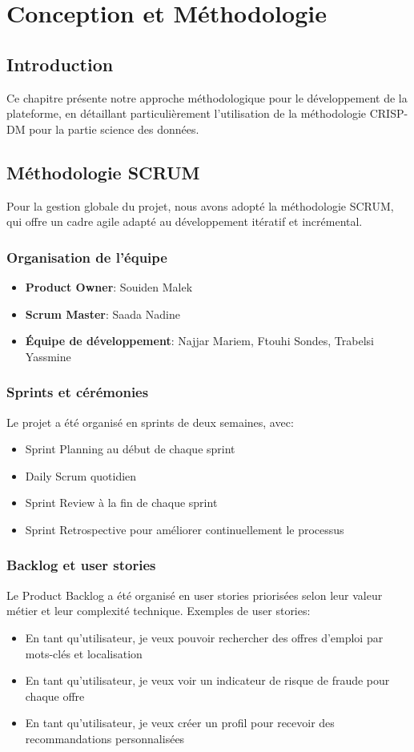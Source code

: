 \documentclass[10pt,a4paper,twocolumn]{article}
\begin{document}
\section{Conception et Méthodologie}
\subsection{Introduction}
Ce chapitre présente notre approche méthodologique pour le développement de la plateforme, en détaillant particulièrement l'utilisation de la méthodologie CRISP-DM pour la partie science des données.

\subsection{Méthodologie SCRUM}
Pour la gestion globale du projet, nous avons adopté la méthodologie SCRUM, qui offre un cadre agile adapté au développement itératif et incrémental.

\subsubsection{Organisation de l'équipe}
\begin{itemize}
    \item \textbf{Product Owner}: Souiden Malek
    \item \textbf{Scrum Master}: Saada Nadine
    \item \textbf{Équipe de développement}: Najjar Mariem, Ftouhi Sondes, Trabelsi Yassmine
\end{itemize}

\subsubsection{Sprints et cérémonies}
Le projet a été organisé en sprints de deux semaines, avec:
\begin{itemize}
    \item Sprint Planning au début de chaque sprint
    \item Daily Scrum quotidien
    \item Sprint Review à la fin de chaque sprint
    \item Sprint Retrospective pour améliorer continuellement le processus
\end{itemize}

\subsubsection{Backlog et user stories}
Le Product Backlog a été organisé en user stories priorisées selon leur valeur métier et leur complexité technique. Exemples de user stories:
\begin{itemize}
    \item En tant qu'utilisateur, je veux pouvoir rechercher des offres d'emploi par mots-clés et localisation
    \item En tant qu'utilisateur, je veux voir un indicateur de risque de fraude pour chaque offre
    \item En tant qu'utilisateur, je veux créer un profil pour recevoir des recommandations personnalisées
\end{itemize}
\end{document}
